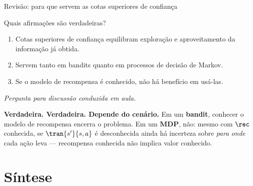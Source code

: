 \documentclass[aspectratio=169, 10pt]{beamer}
\newcommand{\paradiscussao}{\smallskip
  {\footnotesize\color{rlCinza}\itshape Pergunta para discussão conduzida em aula.}}
\begin{document}
\begin{frame}{Revisão: para que servem as cotas superiores de confiança}
  \footnotesize
  \begin{quizbox}{}
    Quais afirmações são verdadeiras?
    \smallskip
    \begin{enumerate}\setlength{\itemsep}{0em}
      \item Cotas superiores de confiança equilibram exploração e aproveitamento
            da informação já obtida.
      \item Servem tanto em bandits quanto em processos de decisão de Markov.
      \item Se o modelo de recompensa é conhecido, não há benefício em usá-las.
    \end{enumerate}
    \paradiscussao
  \end{quizbox}

  \pause
  \begin{respbox}
    \textbf{Verdadeira. Verdadeira. Depende do cenário.}
    Em um \textbf{bandit}, conhecer o modelo de recompensa encerra o problema.
    Em um \textbf{MDP}, não: mesmo com $\rec$ conhecida, se $\tran{s'}{s,a}$ é
    desconhecida ainda há incerteza sobre \emph{para onde} cada ação leva —
    recompensa conhecida não implica valor conhecido.
  \end{respbox}
\end{frame}

\section{Síntese}
\end{document}
